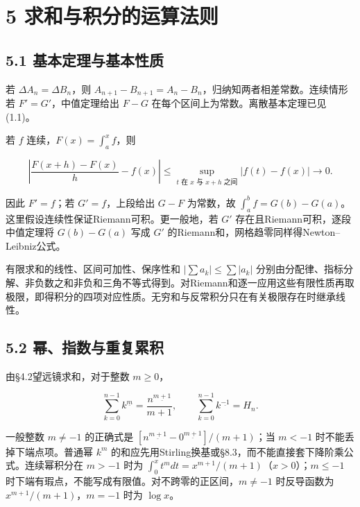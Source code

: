 \documentclass[11pt,a4paper]{article}
\begin{document}
\clearpage

\section{5
求和与积分的运算法则}\label{ux6c42ux548cux4e0eux79efux5206ux7684ux8fd0ux7b97ux6cd5ux5219}

\subsection{5.1
基本定理与基本性质}\label{ux57faux672cux5b9aux7406ux4e0eux57faux672cux6027ux8d28}

若 \(\Delta A_n=\Delta B_n\)，则
\(A_{n+1}-B_{n+1}=A_n-B_n\)，归纳知两者相差常数。连续情形若
\(F'=G'\)，中值定理给出 \(F-G\)
在每个区间上为常数。离散基本定理已见(1.1)。

若 \(f\) 连续，\(F(x)=\int_a^xf\)，则

\[
\left|\frac{F(x+h)-F(x)}h-f(x)\right|
\le\sup_{t\text{ 在 }x\text{ 与 }x+h\text{ 之间}}|f(t)-f(x)|\to0.
\]

因此 \(F'=f\)；若 \(G'=f\)，上段给出 \(G-F\) 为常数，故
\(\int_a^bf=G(b)-G(a)\)。这里假设连续性保证Riemann可积。更一般地，若
\(G'\) 存在且Riemann可积，逐段中值定理将 \(G(b)-G(a)\) 写成 \(G'\)
的Riemann和，网格趋零同样得Newton--Leibniz公式。

有限求和的线性、区间可加性、保序性和 \(|\sum a_k|\le\sum|a_k|\)
分别由分配律、指标分解、非负数之和非负和三角不等式得到。对Riemann和逐一应用这些有限性质再取极限，即得积分的四项对应性质。无穷和与反常积分只在有关极限存在时继承线性。

\subsection{5.2
幂、指数与重复累积}\label{ux5e42ux6307ux6570ux4e0eux91cdux590dux7d2fux79ef}

由§4.2望远镜求和，对于整数 \(m\ge0\)，

\[
\sum_{k=0}^{n-1}k^{\underline m}=\frac{n^{\underline{m+1}}}{m+1},
\qquad \sum_{k=0}^{n-1}k^{\underline{-1}}=H_n.
\]

一般整数 \(m\ne-1\) 的正确式是
\([n^{\underline{m+1}}-0^{\underline{m+1}}]/(m+1)\)；当 \(m<-1\)
时不能丢掉下端点项。普通幂 \(k^m\)
的和应先用Stirling换基或§8.3，而不能直接套下降阶乘公式。连续幂积分在
\(m>-1\) 时为 \(\int_0^xt^m dt=x^{m+1}/(m+1)\)（\(x>0\)）；\(m\le-1\)
时下端有瑕点，不能写成有限值。对不跨零的正区间，\(m\ne-1\) 时反导函数为
\(x^{m+1}/(m+1)\)，\(m=-1\) 时为 \(\log x\)。
\end{document}
